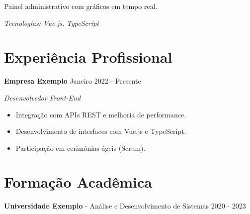 \documentclass[a4paper,10pt]{article}
\begin{document}
Painel administrativo com gráficos em tempo real.

\textit{Tecnologias: Vue.js, TypeScript}

\section*{Experiência Profissional}

\textbf{Empresa Exemplo} \hfill Janeiro 2022 - Presente

\textit{Desenvolvedor Front-End}

\begin{itemize}[leftmargin=*]
    \item Integração com APIs REST e melhoria de performance.
    \item Desenvolvimento de interfaces com Vue.js e TypeScript.
    \item Participação em cerimônias ágeis (Scrum).
\end{itemize}

\section*{Formação Acadêmica}

\textbf{Universidade Exemplo} - Análise e Desenvolvimento de Sistemas \hfill 2020 - 2023
\end{document}
